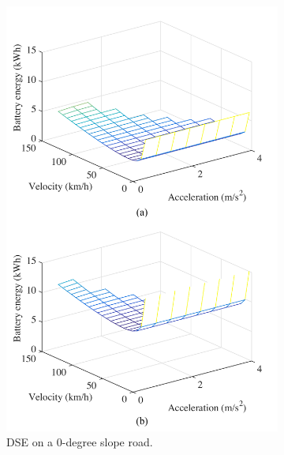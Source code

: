 \documentclass{IEEEtran}
\begin{document}
\begin{figure}   %
\centering
	\begin{subfigure}{0.45\textwidth}
	\includegraphics[width=\hsize]{Figures/Design_space_exploration_top.pdf}
	\caption{DSE on a 0-degree slope road.}
	\label{fig:DSE_0_slope}
	\end{subfigure}
~
	\begin{subfigure}{0.45\textwidth}

\end{subfigure}
\end{figure}
\end{document}
